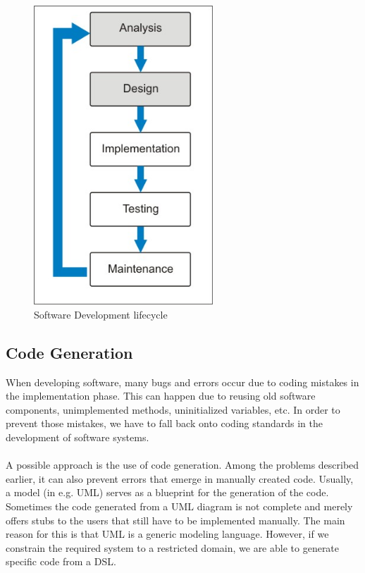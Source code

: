 \begin{figure}[htb]
\centering
\includegraphics[width=0.6\textwidth]{images/lifecycle.jpg}
\caption{Software Development lifecycle}
\label{fig:lifecycle}
\end{figure}

\subsection{Code Generation}

When developing software, many bugs and errors occur due to coding mistakes in the implementation phase. This can happen due to reusing old software components, unimplemented methods, uninitialized variables, etc. In order to prevent those mistakes, we have to fall back onto coding standards in the development of software systems.
\\ \\
A possible approach is the use of code generation. Among the problems described earlier, it can also prevent errors that emerge in manually created code. Usually, a model (in e.g. UML) serves as a blueprint for the generation of the code. Sometimes the code generated from a UML diagram is not complete and merely offers stubs to the users that still have to be implemented manually. The main reason for this is that UML is a generic modeling language. However, if we constrain the required system to a restricted domain, we are able to generate specific code from a DSL. 

